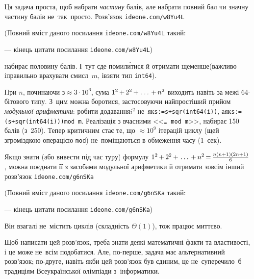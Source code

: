 \documentclass[14pt,a4paper]{extarticle}
\def\dib#1{\,#1\discretionary{}{\mbox{$#1$}}{}\,}
\renewcommand{\baselinestretch}{1.3125}
\begin{document}
\Tutorial
Ця задача проста, щоб набрати \emph{частину} балів, але набрати повний бал чи значну частину балів не~так~просто. Розв'язок 
\verb"ideone.com/w8Yu4L"


{\color{green}\begin{small}

\renewcommand{\baselinestretch}{0.875}

(Повний вміст даного посилання \verb"ideone.com/w8Yu4L" такий:

--- кінець цитати посилання \verb"ideone.com/w8Yu4L")

\end{small}}


 набирає половину балів. 
І~тут є\nolinebreak[2] де помил\'{и}тися й отримати ще\nolinebreak[3] менше\nolinebreak[3] (важливо і\nolinebreak[3] правильно врахувати смисл~$m$, і\nolinebreak[3] взяти тип \texttt{int64}).

При $n$, починаючи з${}\approx3{\cdot}10^6$, сума $1^2\dib{{+}}2^2\dib{{+}}\dots\dib{{+}}n^2$ виходить навіть за межі 64-\nolinebreak[1]бітового типу. З~цим можна боротися, застосовуючи найпростіший прийом \emph{модульної арифметики}: робити додавання\nolinebreak[3] $i^2$ не~як\nolinebreak[3] \verb"s:=s+sqr(int64(i))", а\nolinebreak[2] як\nolinebreak[3] \verb"s:=(s+sqr(int64(i)))mod m". 
Реалізація з вчасними <<\texttt{\dots~mod~m}>>, набирає 150 балів (з~250). 
Тепер критичним стає те, що $\approx{}10^9$ ітерацій циклу (ще\nolinebreak[3] й з\nolinebreak[2] громіздкою операцією \texttt{mod}) не~поміщаються в обмеження часу (1~сек).

Якщо знати (або вивести під час туру) формулу $1^2\dib{{+}}2^2\dib{{+}}\dots\dib{{+}}n^2\dib{{=}}\frac{n(n+1)(2n+1)}{6}$, можна поєднати її з засобами модульної арифметики й отримати зовсім інший розв'язок 
\verb"ideone.com/g6nSKa"


{\color{green}\begin{small}

\renewcommand{\baselinestretch}{0.875}

(Повний вміст даного посилання \verb"ideone.com/g6nSKa" такий:

--- кінець цитати посилання \verb"ideone.com/g6nSKa")

\end{small}}


\hspace{0.5em plus 1em} Він взагалі не~містить циклів (складність $\Theta(1)$), тож працює миттєво.

Щоб написати цей розв'язок, треба знати деякі математичні факти та властивості, і це може не~всім подобатися. Але, по-перше, задача має альтернативний розв'язок; по-друге, навіть якби цей розв'язок був єдиним, це не~суперечило~б традиціям Всеукраїнської олімпіади з~інформатики.
\end{document}
